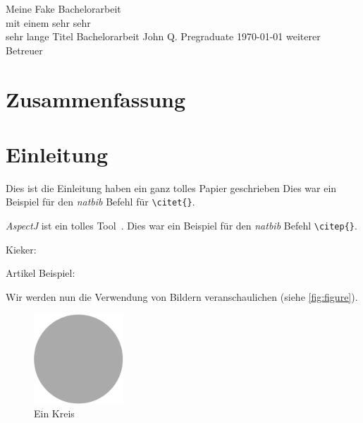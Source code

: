 

\hypersetup{pdftitle=Meine Fake Bachelorarbeit mit einem sehr sehr sehr lange Titel}
\hypersetup{pdfauthor=John Q. Pregraduate}
\hypersetup{pdfsubject=Bachelorarbeit}
\hypersetup{pdfkeywords=}


\frontmatter
  \thesistitlepage
    {Meine Fake Bachelorarbeit \\[.1em]mit einem sehr sehr \\[.1em]sehr lange Titel}%
    {Bachelorarbeit}%
    {John Q. Pregraduate}%
    {\today}%
    {weiterer Betreuer} %

  \eidesstatt{}

  \chapter*{Zusammenfassung}
    \blindtext

  \tableofcontents{}

\mainmatter


\chapter{Einleitung}
  Dies ist die Einleitung
  \citet{Shaw2003} haben ein ganz tolles Papier geschrieben
  Dies war ein Beispiel für den \textit{natbib} Befehl für \texttt{\textbackslash{}citet\{\}}.
  
  \textit{AspectJ} ist ein tolles Tool~\citep{AspectJ}. Dies war ein Beispiel für den \textit{natbib} Befehl \texttt{\textbackslash{}citep\{\}}.
  
  Kieker: \citep{Rohr2008, Hoorn2009, Hoorn2012}
  
  Artikel Beispiel: \citep{Frey2011}
  
  Wir werden nun die Verwendung von Bildern veranschaulichen (siehe \autoref{fig:figure}).
  
  \begin{figure}[t]%
    \centering%
    \includegraphics[width=0.3\textwidth]{img/template_circle.pdf}%
    \caption{Ein Kreis}%
    \label{fig:figure}%
  \end{figure}%


